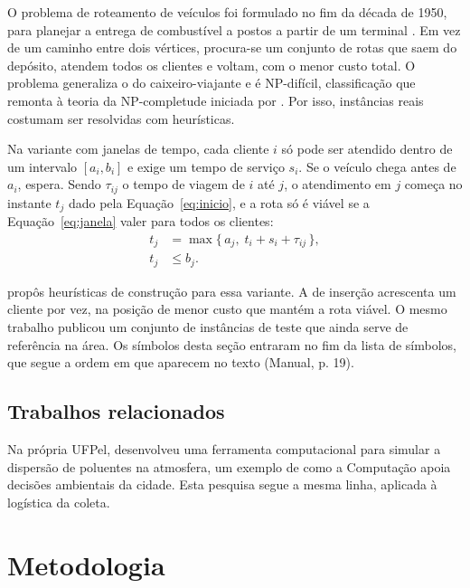 \documentclass[eq,capa]{texufpel}
\begin{document}
O problema de roteamento de veículos foi formulado no fim da década de
1950, para planejar a entrega de combustível a postos a partir de um terminal
\citep{Dantzig:1959:TDP}. Em vez de um caminho entre dois vértices,
procura-se um conjunto de rotas que saem do depósito, atendem todos os
clientes e voltam, com o menor custo total. O problema generaliza o do
caixeiro-viajante e é NP-difícil, classificação que remonta à teoria da
NP-completude iniciada por \citet{Cook:1971:CTP}. Por isso, instâncias reais
costumam ser resolvidas com heurísticas.

Na variante com janelas de tempo, cada cliente $i$ só pode ser atendido
dentro de um intervalo $[a_i, b_i]$ e exige um tempo de serviço $s_i$. Se o
veículo chega antes de $a_i$, espera. Sendo $\tau_{ij}$ o tempo de viagem de
$i$ até $j$, o atendimento em $j$ começa no instante $t_j$ dado pela
Equação~\eqref{eq:inicio}, e a rota só é viável se a
Equação~\eqref{eq:janela} valer para todos os clientes:
\begin{align}
  t_j &= \max \{\, a_j,\; t_i + s_i + \tau_{ij} \,\},
  \label{eq:inicio}\\
  t_j &\le b_j.
  \label{eq:janela}
\end{align}

\citet{Solomon:1987:AVR} propôs heurísticas de construção para essa variante.
A de inserção acrescenta um cliente por vez, na posição de menor custo que
mantém a rota viável. O mesmo trabalho publicou um conjunto de instâncias de
teste que ainda serve de referência na área. Os símbolos desta seção entraram
no fim da lista de símbolos, que segue a ordem em que aparecem no texto
(Manual, p. 19).

\section{Trabalhos relacionados}

Na própria UFPel, \citet{Cruz:2015:FCS} desenvolveu uma ferramenta
computacional para simular a dispersão de poluentes na atmosfera, um exemplo
de como a Computação apoia decisões ambientais da cidade. Esta pesquisa segue
a mesma linha, aplicada à logística da coleta.

\chapter{Metodologia}
\label{cap:metodologia}
\end{document}
